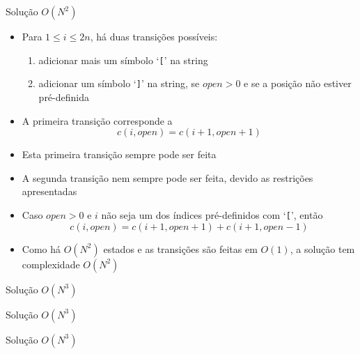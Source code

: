 \begin{frame}[fragile]{Solução $O(N^2)$}

    \begin{itemize}
        \item Para $1\leq i\leq 2n$, há duas transições possíveis:
        \begin{enumerate}
            \item adicionar mais um símbolo `\texttt{[}' na string
            \item adicionar um símbolo `\texttt{]}' na string, se $open > 0$ e se a posição não
                estiver pré-definida
        \end{enumerate}

        \item A primeira transição corresponde a
        \[
            c(i, open) = c(i + 1, open + 1)
        \]

        \item Esta primeira transição sempre pode ser feita

        \item A segunda transição nem sempre pode ser feita, devido as restrições apresentadas

        \item Caso $open > 0$ e $i$ não seja um dos índices pré-definidos com `\texttt{[}', então
        \[
            c(i, open) = c(i + 1, open + 1) + c(i + 1, open - 1)
        \]

        \item Como há $O(N^2)$ estados e as transições são feitas em $O(1)$, a solução tem
            complexidade $O(N^2)$
    \end{itemize}

\end{frame}

\begin{frame}[fragile]{Solução $O(N^3)$}
\end{frame}

\begin{frame}[fragile]{Solução $O(N^3)$}
\end{frame}

\begin{frame}[fragile]{Solução $O(N^3)$}
\end{frame}
